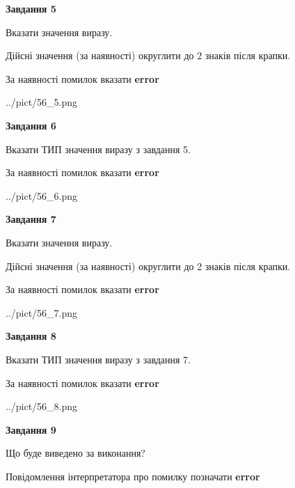\documentclass[11pt, ukrainian]{article}
\begin{document}
{\begin {large}
{\begin {center}\textbf{Завдання 5}\end {center}}\par
Вказати значення виразу. \par
Дійсні значення (за наявності) округлити до 2 знаків після крапки. \par
За наявності помилок вказати \textbf{error}

\begin{center}
	{../pict/56_5.png}
\end{center}
\newpage

{\begin {center}\textbf{Завдання 6}\end {center}}\par
Вказати ТИП значення виразу з завдання 5. \par
За наявності помилок вказати \textbf{error}

\begin{center}
	{../pict/56_6.png}
\end{center}
\newpage

{\begin {center}\textbf{Завдання 7}\end {center}}\par
Вказати значення виразу. \par
Дійсні значення (за наявності) округлити до 2 знаків після крапки. \par
За наявності помилок вказати \textbf{error}

\begin{center}
	{../pict/56_7.png}
\end{center}
\newpage

{\begin {center}\textbf{Завдання 8}\end {center}}\par
Вказати ТИП значення виразу з завдання 7. \par
За наявності помилок вказати \textbf{error}

\begin{center}
	{../pict/56_8.png}
\end{center}
\newpage

{\begin {center}\textbf{Завдання 9}\end {center}}\par
Що буде виведено за виконання? \par
Повідомлення інтерпретатора про помилку позначати \textbf{error}


\end{large}}
\end{document}
